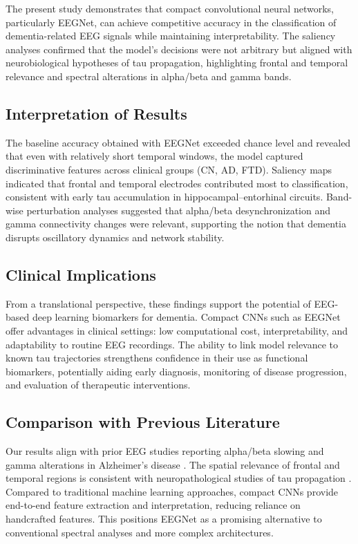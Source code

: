 \documentclass[12pt,a4paper]{article}
\begin{document}
The present study demonstrates that compact convolutional neural networks, particularly EEGNet, can achieve competitive accuracy in the classification of dementia-related EEG signals while maintaining interpretability. The saliency analyses confirmed that the model’s decisions were not arbitrary but aligned with neurobiological hypotheses of tau propagation, highlighting frontal and temporal relevance and spectral alterations in alpha/beta and gamma bands.

\subsection{Interpretation of Results}
The baseline accuracy obtained with EEGNet exceeded chance level and revealed that even with relatively short temporal windows, the model captured discriminative features across clinical groups (CN, AD, FTD). Saliency maps indicated that frontal and temporal electrodes contributed most to classification, consistent with early tau accumulation in hippocampal–entorhinal circuits. Band-wise perturbation analyses suggested that alpha/beta desynchronization and gamma connectivity changes were relevant, supporting the notion that dementia disrupts oscillatory dynamics and network stability.

\subsection{Clinical Implications}
From a translational perspective, these findings support the potential of EEG-based deep learning biomarkers for dementia. Compact CNNs such as EEGNet offer advantages in clinical settings: low computational cost, interpretability, and adaptability to routine EEG recordings. The ability to link model relevance to known tau trajectories strengthens confidence in their use as functional biomarkers, potentially aiding early diagnosis, monitoring of disease progression, and evaluation of therapeutic interventions.

\subsection{Comparison with Previous Literature}
Our results align with prior EEG studies reporting alpha/beta slowing and gamma alterations in Alzheimer’s disease \cite{dePaula2009, Ajra2023}. The spatial relevance of frontal and temporal regions is consistent with neuropathological studies of tau propagation \cite{Tolnay1999}. Compared to traditional machine learning approaches, compact CNNs provide end-to-end feature extraction and interpretation, reducing reliance on handcrafted features. This positions EEGNet as a promising alternative to conventional spectral analyses and more complex architectures.
\end{document}
